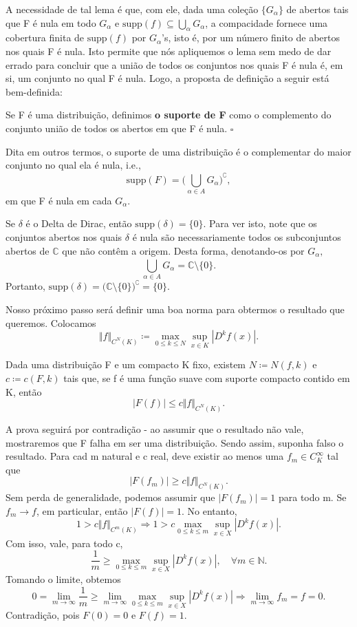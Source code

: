 \documentclass[measure_theory.tex]{subfiles}
\begin{document}
A necessidade de tal lema é que, com ele, dada uma coleção \(\{G_{\alpha }\}\) de abertos tais que F é nula em todo \(G_{\alpha }\) e \(\mathrm{supp}(f)\subseteq \bigcup_{\alpha }^{}G_{\alpha }\), a compacidade fornece uma cobertura finita de
\(\mathrm{supp}(f)\) por \(G_{\alpha }\)'s, isto é, por um número finito de abertos nos quais F é nula. Isto permite que nós apliquemos o lema sem medo de dar errado para concluir que a união de todos os conjuntos nos quais F é nula é, em si, um conjunto
no qual F é nula. Logo, a proposta de definição a seguir está bem-definida:
\begin{def*}
	Se F é uma distribuição, definimos \textbf{o suporte de F} como o complemento do conjunto união de todos os abertos em que F é nula. \(\square\)
\end{def*}
Dita em outros termos, o suporte de uma distribuição é o complementar do maior conjunto no qual ela é nula, i.e.,
\[
	\mathrm{supp}(F) = \biggl(\bigcup_{\alpha \in A}^{}G_{\alpha }\biggr)^{\complement},
\]
em que F é nula em cada \(G_{\alpha }\).
\begin{example}
	Se \(\delta \) é o Delta de Dirac, então \(\mathrm{supp}(\delta ) = \{0\}\). Para ver isto, note que os conjuntos abertos nos quais \(\delta \) é nula são necessariamente todos os subconjuntos abertos de \(\mathbb{C}\) que não contêm a origem. Desta forma, denotando-os por \(G_{\alpha },\)
	\[
		\bigcup_{\alpha \in A}^{}G_{\alpha } = \mathbb{C}\setminus{\{0\}}.
	\]
	Portanto, \(\mathrm{supp}(\delta ) = \biggl(\mathbb{C}\setminus{\{0\}}\biggr)^{\complement} = \{0\}.\)
\end{example}
Nosso próximo passo será definir uma boa norma para obtermos o resultado que queremos. Colocamos
\[
	\Vert f \Vert_{C^{N}(K)} \coloneqq \max_{0\leq k\leq N}\sup_{x\in K}|D^{k}f(x)|.
\]
\begin{prop*}
	Dada uma distribuição F e um compacto K fixo, existem \(N\coloneqq N(f, k)\) e \(c\coloneqq c(F, k)\) tais que, se f é uma função suave com suporte compacto contido em K, então
	\[
		|F(f)|\leq c\Vert f \Vert_{C^{N}(K)}.
	\]
\end{prop*}
\begin{proof*}
	A prova seguirá por contradição - ao assumir que o resultado não vale, mostraremos que F falha em ser uma distribuição. Sendo assim, suponha falso o resultado. Para cad m natural e c real, deve existir ao menos uma \(f_{m}\in C_{K}^{\infty}\) tal que
	\[
		|F(f_{m})| \geq c\Vert f \Vert_{C^{N}(K)}.
	\]
	Sem perda de generalidade, podemos assumir que \(|F(f_{m})| = 1\) para todo m. Se \(f_{m}\to f\), em particular, então \(|F(f)| = 1.\) No entanto,
	\[
		1 > c \Vert f \Vert_{C^{m}(K)}\Rightarrow 1 > c \max_{0 \leq k \leq m}\sup_{x\in X}|D^{k}f(x)|.
	\]
	Com isso, vale, para todo c,
	\[
		\frac{1}{m}\geq \max_{0 \leq k \leq m}\sup_{x\in X}|D^{k}f(x)|,\quad \forall m\in \mathbb{N}.
	\]
	Tomando o limite, obtemos
	\[
		0 = \lim_{m\to \infty}\frac{1}{m} \geq \lim_{m\to \infty}\max_{0\leq k\leq m}\sup_{x\in X}|D^{k}f(x)| \Rightarrow \lim_{m\to \infty}f_{m} = f = 0.
	\]
	Contradição, pois \(F(0) = 0\) e \(F(f) = 1\). \qedsymbol
\end{proof*}
\end{document}
